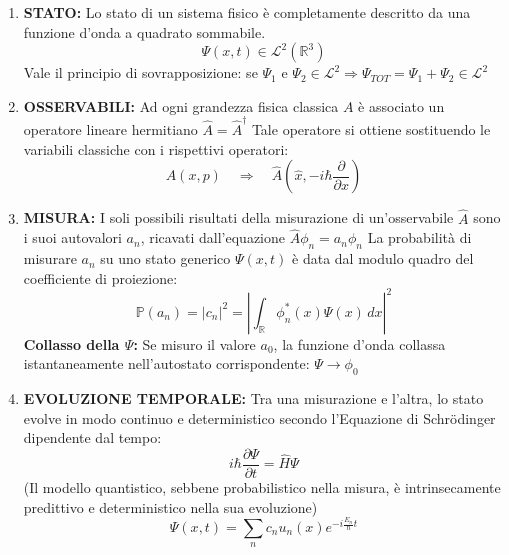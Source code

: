 \documentclass[11pt, a4paper]{article}
\begin{document}
\begin{enumerate}
    \item \textbf{STATO:} Lo stato di un sistema fisico è completamente descritto da una funzione d'onda a quadrato sommabile. %
    \begin{equation*}
        \Psi(x,t) \in \mathcal{L}^2(\mathbb{R}^3) %
    \end{equation*}
    Vale il principio di sovrapposizione: se $\Psi_1$ e $\Psi_2 \in \mathcal{L}^2 \Rightarrow \Psi_{TOT} = \Psi_1 + \Psi_2 \in \mathcal{L}^2$ %

    \item \textbf{OSSERVABILI:} Ad ogni grandezza fisica classica $A$ è associato un operatore lineare hermitiano $\hat{A} = \hat{A}^\dagger$ %
    Tale operatore si ottiene sostituendo le variabili classiche con i rispettivi operatori: %
    \begin{equation*}
        A(x,p) \quad \Rightarrow \quad \hat{A}\left(\hat{x}, -i\hbar \frac{\partial}{\partial x}\right) %
    \end{equation*}

    \item \textbf{MISURA:} I soli possibili risultati della misurazione di un'osservabile $\hat{A}$ sono i suoi autovalori $a_n$, ricavati dall'equazione $\hat{A}\phi_n = a_n\phi_n$ %
    La probabilità di misurare $a_n$ su uno stato generico $\Psi(x,t)$ è data dal modulo quadro del coefficiente di proiezione: %
    \begin{equation*}
        \mathbb{P}(a_n) = |c_n|^2 = \left| \int_{\mathbb{R}} \phi_n^*(x) \Psi(x) \, dx \right|^2 %
    \end{equation*}
    \textbf{Collasso della $\Psi$:} Se misuro il valore $a_0$, la funzione d'onda collassa istantaneamente nell'autostato corrispondente: $\Psi \to \phi_0$ %

    \item \textbf{EVOLUZIONE TEMPORALE:} Tra una misurazione e l'altra, lo stato evolve in modo continuo e deterministico secondo l'Equazione di Schrödinger dipendente dal tempo: %
    \begin{equation}
        \boxed{ i\hbar \frac{\partial \Psi}{\partial t} = \hat{H} \Psi } %
    \end{equation}
    (Il modello quantistico, sebbene probabilistico nella misura, è intrinsecamente predittivo e deterministico nella sua evoluzione) %
    \begin{equation*}
        \Psi(x,t) = \sum_n c_n u_n(x) e^{-i\frac{E_n}{\hbar}t} %
    \end{equation*}
\end{enumerate}
\end{document}
